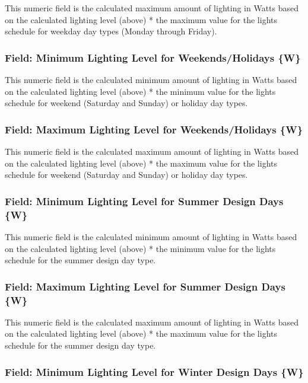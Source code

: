 This numeric field is the calculated maximum amount of lighting in Watts based on the calculated lighting level (above) * the maximum value for the lights schedule for weekday day types (Monday through Friday).

\subsubsection{Field: Minimum Lighting Level for Weekends/Holidays \{W\}}\label{field-minimum-lighting-level-for-weekends-holidays-w}

This numeric field is the calculated minimum amount of lighting in Watts based on the calculated lighting level (above) * the minimum value for the lights schedule for weekend (Saturday and Sunday) or holiday day types.

\subsubsection{Field: Maximum Lighting Level for Weekends/Holidays \{W\}}\label{field-maximum-lighting-level-for-weekends-holidays-w}

This numeric field is the calculated maximum amount of lighting in Watts based on the calculated lighting level (above) * the maximum value for the lights schedule for weekend (Saturday and Sunday) or holiday day types.

\subsubsection{Field: Minimum Lighting Level for Summer Design Days \{W\}}\label{field-minimum-lighting-level-for-summer-designdays-w}

This numeric field is the calculated minimum amount of lighting in Watts based on the calculated lighting level (above) * the minimum value for the lights schedule for the summer design day type.

\subsubsection{Field: Maximum Lighting Level for Summer Design Days \{W\}}\label{field-maximum-lighting-level-for-summer-designdays-w}

This numeric field is the calculated maximum amount of lighting in Watts based on the calculated lighting level (above) * the maximum value for the lights schedule for the summer design day type.

\subsubsection{Field: Minimum Lighting Level for Winter Design Days \{W\}}\label{field-minimum-lighting-level-for-winter-designdays-w}


